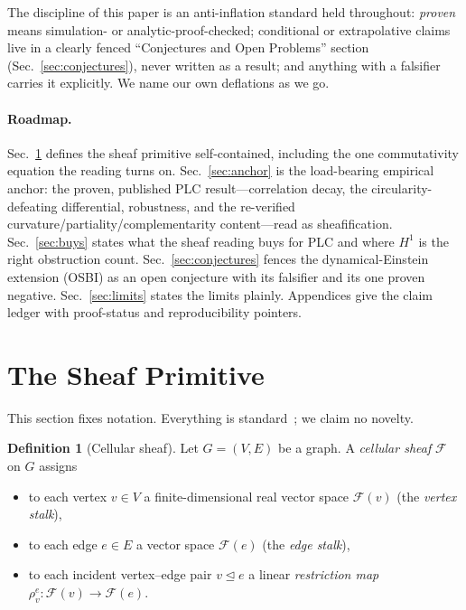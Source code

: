 \documentclass[aps,pra,twocolumn,superscriptaddress,floatfix]{revtex4-2}
\theoremstyle{definition}
\newtheorem{definition}{Definition}
\begin{document}
The discipline of this paper is an anti-inflation standard held throughout:
\emph{proven} means simulation- or analytic-proof-checked; conditional or
extrapolative claims live in a clearly fenced ``Conjectures and Open Problems''
section (Sec.~\ref{sec:conjectures}), never written as a result; and anything
with a falsifier carries it explicitly. We name our own deflations as we go.

\paragraph{Roadmap.}
Sec.~\ref{sec:sheaf} defines the sheaf primitive self-contained, including the
one commutativity equation the reading turns on. Sec.~\ref{sec:anchor} is the
load-bearing empirical anchor: the proven, published PLC result---correlation
decay, the circularity-defeating differential, robustness, and the re-verified
curvature/partiality/complementarity content---read as sheafification.
Sec.~\ref{sec:buys} states what the sheaf reading buys for PLC and where $H^1$ is
the right obstruction count. Sec.~\ref{sec:conjectures} fences the
dynamical-Einstein extension (OSBI) as an open conjecture with its falsifier and
its one proven negative. Sec.~\ref{sec:limits} states the limits plainly.
Appendices give the claim ledger with proof-status and reproducibility pointers.

\section{The Sheaf Primitive}
\label{sec:sheaf}

This section fixes notation. Everything is standard~\cite{curry2014,hansenghrist2019};
we claim no novelty.

\begin{definition}[Cellular sheaf]
Let $G=(V,E)$ be a graph. A \emph{cellular sheaf} $\mathcal{F}$ on $G$ assigns
\begin{itemize}
\item to each vertex $v\in V$ a finite-dimensional real vector space
$\mathcal{F}(v)$ (the \emph{vertex stalk}),
\item to each edge $e\in E$ a vector space $\mathcal{F}(e)$ (the \emph{edge
stalk}),
\item to each incident vertex--edge pair $v\trianglelefteq e$ a linear
\emph{restriction map} $\rho^e_v:\mathcal{F}(v)\to\mathcal{F}(e)$.
\end{itemize}
\end{definition}
\end{document}
